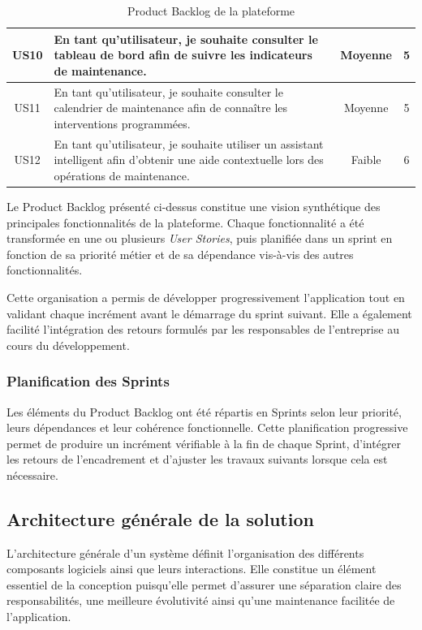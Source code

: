 \begin{table}[H]
\begin{tabular}{|c|p{6cm}|c|c|}
US10 &
En tant qu'utilisateur, je souhaite consulter le tableau de bord afin de suivre les indicateurs de maintenance. &
Moyenne &
5
\\
\hline

US11 &
En tant qu'utilisateur, je souhaite consulter le calendrier de maintenance afin de connaître les interventions programmées. &
Moyenne &
5
\\
\hline

US12 &
En tant qu'utilisateur, je souhaite utiliser un assistant intelligent afin d'obtenir une aide contextuelle lors des opérations de maintenance. &
Faible &
6
\\
\hline

\end{tabular}

\caption{Product Backlog de la plateforme}
\label{tab:product-backlog}

\end{table} 

Le Product Backlog présenté ci-dessus constitue une vision synthétique des principales fonctionnalités de la plateforme. Chaque fonctionnalité a été transformée en une ou plusieurs \textit{User Stories}, puis planifiée dans un sprint en fonction de sa priorité métier et de sa dépendance vis-à-vis des autres fonctionnalités.

Cette organisation a permis de développer progressivement l'application tout en validant chaque incrément avant le démarrage du sprint suivant. Elle a également facilité l'intégration des retours formulés par les responsables de l'entreprise au cours du développement.

\subsubsection{Planification des Sprints}

Les éléments du Product Backlog ont été répartis en Sprints selon leur priorité, leurs dépendances et leur cohérence fonctionnelle. Cette planification progressive permet de produire un incrément vérifiable à la fin de chaque Sprint, d’intégrer les retours de l’encadrement et d’ajuster les travaux suivants lorsque cela est nécessaire.

\subsection{Architecture générale de la solution}

L'architecture générale d'un système définit l'organisation des différents composants logiciels ainsi que leurs interactions. Elle constitue un élément essentiel de la conception puisqu'elle permet d'assurer une séparation claire des responsabilités, une meilleure évolutivité ainsi qu'une maintenance facilitée de l'application.

